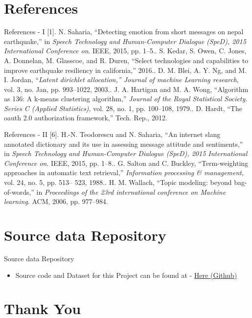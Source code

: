 \documentclass[10pt]{beamer}
\begin{document}
\section{References}
\begin{frame}[fragile]{ References - I}
[1]. N. Saharia, “Detecting emotion from short messages on nepal earthquake,”
in \textit{Speech Technology and Human-Computer Dialogue (SpeD),
2015 International Conference on}. IEEE, 2015, pp. 1–5.\newline
[2]. S. Kedar, S. Owen, C. Jones, A. Donnelan, M. Glasscoe, and R. Duren,
“Select technologies and capabilities to improve earthquake resiliency in
california,” 2016.\newline
[3]. D. M. Blei, A. Y. Ng, and M. I. Jordan, “\textit{Latent dirichlet allocation,”
Journal of machine Learning research}, vol. 3, no. Jan, pp. 993–1022,
2003.\newline
[4]. J. A. Hartigan and M. A. Wong, “Algorithm as 136: A k-means clustering
algorithm,” \textit{Journal of the Royal Statistical Society. Series C (Applied
Statistics)}, vol. 28, no. 1, pp. 100–108, 1979.\newline
[5]. D. Hardt, “The oauth 2.0 authorization framework,” Tech. Rep., 2012.

 
 \end{frame}
 \begin{frame}[fragile]{ References - II}
[6]. H.-N. Teodorescu and N. Saharia, “An internet slang annotated dictionary
and its use in assessing message attitude and sentiments,” in \textit{Speech
Technology and Human-Computer Dialogue (SpeD), 2015 International
Conference on}. IEEE, 2015, pp. 1–8.\newline
[7]. G. Salton and C. Buckley, “Term-weighting approaches in automatic text
retrieval,” \textit{Information processing \& management}, vol. 24, no. 5, pp. 513–
523, 1988.\newline
[8]. H. M. Wallach, “Topic modeling: beyond bag-of-words,” in \textit{Proceedings
of the 23rd international conference on Machine learning}. ACM, 2006,
pp. 977–984.
 \end{frame}
 
\section{Source data Repository}
\begin{frame}[fragile]{Source data Repository}
\begin{itemize}
\item Source code and Dataset for this Project can be found at -
\href{https://www.github.com}{ Here (Github)} 
\end{itemize}

 \end{frame}
 \section{Thank You}
 
 
\end{document}
